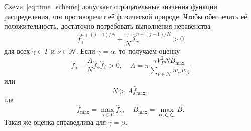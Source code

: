 \documentclass[a4paper,12pt]{article}
\newcommand{\bzeta}{\boldsymbol{\zeta}}
\newcommand{\Nu}{\mathcal{N}}
\begin{document}
Схема~\eqref{eq:time_scheme} допускает отрицательные значения функции распределения,
что противоречит её физической природе. Чтобы обеспечить её положительность,
достаточно потребовать выполнения неравенства
\begin{equation}\label{eq:positive_f}
    \hat{f}_\gamma^{n+(j-1)/N} + \frac{\tau}N \hat{\mathscr{J}}_\gamma^{n+(j-1)/N} > 0
\end{equation}
для всех \(\gamma\in\Gamma\) и \(\nu\in\Nu\).
Если \(\gamma = \alpha\), то получаем оценку
\begin{equation}\label{eq:positive_f_alpha}
    \hat{f}_{\alpha} - \frac{A}{N}\hat{f}_{\alpha}\hat{f}_{\beta} > 0, \quad
    A = \pi\frac{\tau V_\Gamma^2 N B_{\max}}{\sum_{\nu\in\Nu} w_{\alpha}w_{\beta}}
\end{equation}
или
\begin{equation}\label{eq:positive_f_alpha2}
    N > A \hat{f}_{\max},
\end{equation}
где
\begin{equation}\label{eq:hat_f_max}
    \hat{f}_{\max} = \max_{\gamma\in\Gamma} \hat{f}_\gamma, \quad
    B_{\max} = \max_{\boldsymbol\alpha, \bzeta, \bzeta_*} B.
\end{equation}
Такая же оценка справедлива для \(\gamma = \beta\).
\end{document}
